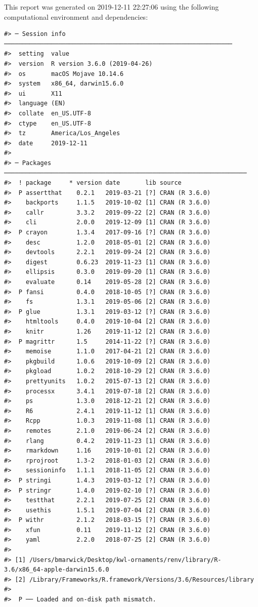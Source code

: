 \documentclass[]{article}
\begin{document}
This report was generated on 2019-12-11 22:27:06 using the following
computational environment and dependencies:

\begin{verbatim}
#> ─ Session info ───────────────────────────────────────────────────────────────
#>  setting  value                       
#>  version  R version 3.6.0 (2019-04-26)
#>  os       macOS Mojave 10.14.6        
#>  system   x86_64, darwin15.6.0        
#>  ui       X11                         
#>  language (EN)                        
#>  collate  en_US.UTF-8                 
#>  ctype    en_US.UTF-8                 
#>  tz       America/Los_Angeles         
#>  date     2019-12-11                  
#> 
#> ─ Packages ───────────────────────────────────────────────────────────────────
#>  ! package     * version date       lib source        
#>  P assertthat    0.2.1   2019-03-21 [?] CRAN (R 3.6.0)
#>    backports     1.1.5   2019-10-02 [1] CRAN (R 3.6.0)
#>    callr         3.3.2   2019-09-22 [2] CRAN (R 3.6.0)
#>    cli           2.0.0   2019-12-09 [1] CRAN (R 3.6.0)
#>  P crayon        1.3.4   2017-09-16 [?] CRAN (R 3.6.0)
#>    desc          1.2.0   2018-05-01 [2] CRAN (R 3.6.0)
#>    devtools      2.2.1   2019-09-24 [2] CRAN (R 3.6.0)
#>    digest        0.6.23  2019-11-23 [1] CRAN (R 3.6.0)
#>    ellipsis      0.3.0   2019-09-20 [1] CRAN (R 3.6.0)
#>    evaluate      0.14    2019-05-28 [2] CRAN (R 3.6.0)
#>  P fansi         0.4.0   2018-10-05 [?] CRAN (R 3.6.0)
#>    fs            1.3.1   2019-05-06 [2] CRAN (R 3.6.0)
#>  P glue          1.3.1   2019-03-12 [?] CRAN (R 3.6.0)
#>    htmltools     0.4.0   2019-10-04 [2] CRAN (R 3.6.0)
#>    knitr         1.26    2019-11-12 [2] CRAN (R 3.6.0)
#>  P magrittr      1.5     2014-11-22 [?] CRAN (R 3.6.0)
#>    memoise       1.1.0   2017-04-21 [2] CRAN (R 3.6.0)
#>    pkgbuild      1.0.6   2019-10-09 [2] CRAN (R 3.6.0)
#>    pkgload       1.0.2   2018-10-29 [2] CRAN (R 3.6.0)
#>    prettyunits   1.0.2   2015-07-13 [2] CRAN (R 3.6.0)
#>    processx      3.4.1   2019-07-18 [2] CRAN (R 3.6.0)
#>    ps            1.3.0   2018-12-21 [2] CRAN (R 3.6.0)
#>    R6            2.4.1   2019-11-12 [1] CRAN (R 3.6.0)
#>    Rcpp          1.0.3   2019-11-08 [1] CRAN (R 3.6.0)
#>    remotes       2.1.0   2019-06-24 [2] CRAN (R 3.6.0)
#>    rlang         0.4.2   2019-11-23 [1] CRAN (R 3.6.0)
#>    rmarkdown     1.16    2019-10-01 [2] CRAN (R 3.6.0)
#>    rprojroot     1.3-2   2018-01-03 [2] CRAN (R 3.6.0)
#>    sessioninfo   1.1.1   2018-11-05 [2] CRAN (R 3.6.0)
#>  P stringi       1.4.3   2019-03-12 [?] CRAN (R 3.6.0)
#>  P stringr       1.4.0   2019-02-10 [?] CRAN (R 3.6.0)
#>    testthat      2.2.1   2019-07-25 [2] CRAN (R 3.6.0)
#>    usethis       1.5.1   2019-07-04 [2] CRAN (R 3.6.0)
#>  P withr         2.1.2   2018-03-15 [?] CRAN (R 3.6.0)
#>    xfun          0.11    2019-11-12 [2] CRAN (R 3.6.0)
#>    yaml          2.2.0   2018-07-25 [2] CRAN (R 3.6.0)
#> 
#> [1] /Users/bmarwick/Desktop/kwl-ornaments/renv/library/R-3.6/x86_64-apple-darwin15.6.0
#> [2] /Library/Frameworks/R.framework/Versions/3.6/Resources/library
#> 
#>  P ── Loaded and on-disk path mismatch.
\end{verbatim}
\end{document}

